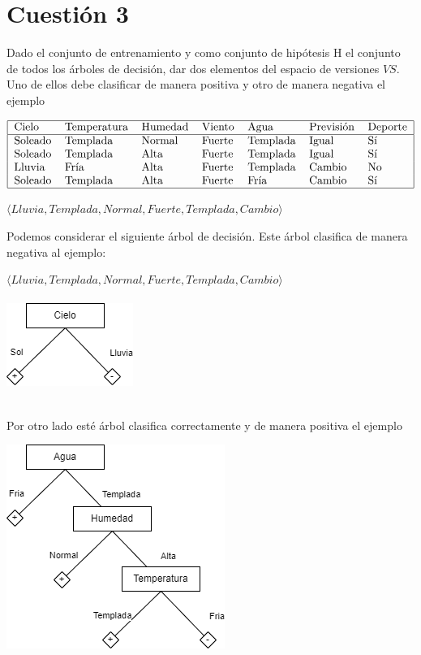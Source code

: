 \documentclass{article}
\begin{document}
\section*{Cuestión 3}
Dado el conjunto de entrenamiento y como conjunto de hipótesis H el conjunto de todos los árboles de decisión, dar dos elementos del espacio de versiones \(VS\). Uno de ellos debe clasificar de manera positiva y
otro de manera negativa el ejemplo
\begin{table}[!htbp]
\begin{align*}
    \begin{tabular}{|lllllll|}
    \hline
    Cielo   & Temperatura & Humedad & Viento & Agua     & Previsión & Deporte \\ \hline
    Soleado & Templada    & Normal  & Fuerte & Templada & Igual     & Sí      \\
    Soleado & Templada    & Alta    & Fuerte & Templada & Igual     & Sí      \\
    Lluvia  & Fría        & Alta    & Fuerte & Templada & Cambio    & No      \\
    Soleado & Templada    & Alta    & Fuerte & Fría     & Cambio    & Sí      \\ \hline
    \end{tabular}
\end{align*}
\end{table}
\begin{center}\(\langle Lluvia, Templada, Normal, Fuerte, Templada, Cambio \rangle\)\end{center}
Podemos considerar el siguiente árbol de decisión. Este árbol clasifica de manera negativa al ejemplo:
\begin{center}\(\langle Lluvia, Templada, Normal, Fuerte, Templada, Cambio \rangle\)\\\\
\includegraphics[scale=0.5]{tiempo_1.png}\end{center}\\
Por otro lado esté árbol clasifica correctamente y de manera positiva el ejemplo\\
\begin{center}\includegraphics[scale=0.5]{tiempo_2.png}\end{center}\\
\end{document}

